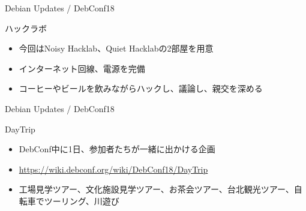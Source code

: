 \begin{frame}{Debian Updates / DebConf18}%

ハックラボ
\begin{itemize}
\item 今回はNoisy Hacklab、Quiet Hacklabの2部屋を用意
\item インターネット回線、電源を完備
\item コーヒーやビールを飲みながらハックし、議論し、親交を深める
\end{itemize}


\end{frame}


\begin{frame}{Debian Updates / DebConf18}%

DayTrip
\begin{itemize}
\item DebConf中に1日、参加者たちが一緒に出かける企画
\item \url{https://wiki.debconf.org/wiki/DebConf18/DayTrip}
\item 工場見学ツアー、文化施設見学ツアー、お茶会ツアー、台北観光ツアー、自転車でツーリング、川遊び
\end{itemize}


\end{frame}


